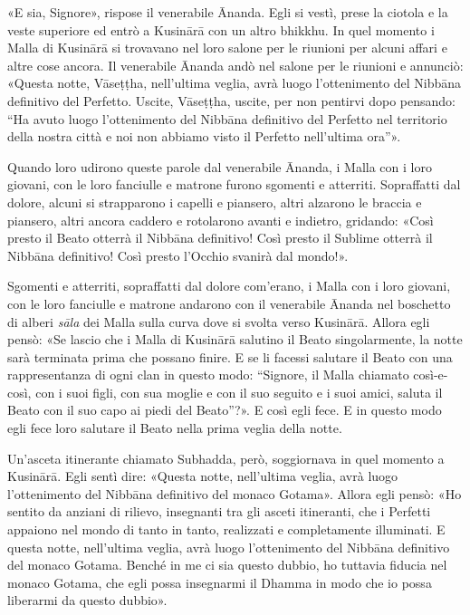«E sia, Signore», rispose il venerabile Ānanda. Egli si vestì, prese la ciotola
e la veste superiore ed entrò a Kusinārā con un altro bhikkhu. In quel momento i
Malla di Kusinārā si trovavano nel loro salone per le riunioni per alcuni affari
e altre cose ancora. Il venerabile Ānanda andò nel salone per le riunioni e
annunciò: «Questa notte, Vāseṭṭha, nell’ultima veglia, avrà luogo l’ottenimento
del Nibbāna definitivo del Perfetto. Uscite, Vāseṭṭha, uscite, per non pentirvi
dopo pensando: “Ha avuto luogo l’ottenimento del Nibbāna definitivo del Perfetto
nel territorio della nostra città e noi non abbiamo visto il Perfetto
nell’ultima ora”».

Quando loro udirono queste parole dal venerabile Ānanda, i Malla con i loro
giovani, con le loro fanciulle e matrone furono sgomenti e atterriti.
Sopraffatti dal dolore, alcuni si strapparono i capelli e piansero, altri
alzarono le braccia e piansero, altri ancora caddero e rotolarono avanti e
indietro, gridando: «Così presto il Beato otterrà il Nibbāna definitivo! Così
presto il Sublime otterrà il Nibbāna definitivo! Così presto l’Occhio svanirà
dal mondo!».

Sgomenti e atterriti, sopraffatti dal dolore com’erano, i Malla con i loro
giovani, con le loro fanciulle e matrone andarono con il venerabile Ānanda nel
boschetto di alberi \emph{sāla} dei Malla sulla curva dove si svolta verso
Kusinārā. Allora egli pensò: «Se lascio che i Malla di Kusinārā salutino il
Beato singolarmente, la notte sarà terminata prima che possano finire. E se li
facessi salutare il Beato con una rappresentanza di ogni clan in questo modo:
“Signore, il Malla chiamato così-e-così, con i suoi figli, con sua moglie e con
il suo seguito e i suoi amici, saluta il Beato con il suo capo ai piedi del
Beato”?». E così egli fece. E in questo modo egli fece loro salutare il Beato
nella prima veglia della notte.

Un’asceta itinerante chiamato Subhadda, però, soggiornava in quel momento a
Kusinārā. Egli sentì dire: «Questa notte, nell’ultima veglia, avrà luogo
l’ottenimento del Nibbāna definitivo del monaco Gotama». Allora egli pensò: «Ho
sentito da anziani di rilievo, insegnanti tra gli asceti itineranti, che i
Perfetti appaiono nel mondo di tanto in tanto, realizzati e completamente
illuminati. E questa notte, nell’ultima veglia, avrà luogo l’ottenimento del
Nibbāna definitivo del monaco Gotama. Benché in me ci sia questo dubbio, ho
tuttavia fiducia nel monaco Gotama, che egli possa insegnarmi il Dhamma in modo
che io possa liberarmi da questo dubbio».

